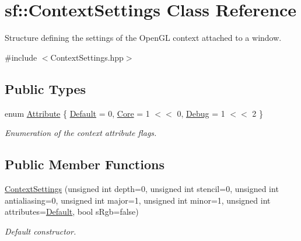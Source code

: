 \hypertarget{structsf_1_1_context_settings}{}\section{sf\+:\+:Context\+Settings Class Reference}
\label{structsf_1_1_context_settings}


Structure defining the settings of the Open\+GL context attached to a window.  




{\ttfamily \#include $<$Context\+Settings.\+hpp$>$}

\subsection*{Public Types}
\begin{DoxyCompactItemize}
\item 
enum \hyperlink{structsf_1_1_context_settings_af2e91e57e8d26c40afe2ec8efaa32a2c}{Attribute} \{ \hyperlink{structsf_1_1_context_settings_af2e91e57e8d26c40afe2ec8efaa32a2cabf868dcb751b909bf031484ed42a93bb}{Default} = 0, 
\hyperlink{structsf_1_1_context_settings_af2e91e57e8d26c40afe2ec8efaa32a2cacb581130734cbd87cbbc9438429f4a8b}{Core} = 1 $<$$<$ 0, 
\hyperlink{structsf_1_1_context_settings_af2e91e57e8d26c40afe2ec8efaa32a2ca6043f67afb3d48918d5336474eabaafc}{Debug} = 1 $<$$<$ 2
 \}\begin{DoxyCompactList}\small\item\em Enumeration of the context attribute flags. \end{DoxyCompactList}
\end{DoxyCompactItemize}
\subsection*{Public Member Functions}
\begin{DoxyCompactItemize}
\item 
\hyperlink{structsf_1_1_context_settings_ac56869ccbb6bf0df48b88880754e12b7}{Context\+Settings} (unsigned int depth=0, unsigned int stencil=0, unsigned int antialiasing=0, unsigned int major=1, unsigned int minor=1, unsigned int attributes=\hyperlink{structsf_1_1_context_settings_af2e91e57e8d26c40afe2ec8efaa32a2cabf868dcb751b909bf031484ed42a93bb}{Default}, bool s\+Rgb=false)
\begin{DoxyCompactList}\small\item\em Default constructor. \end{DoxyCompactList}\end{DoxyCompactItemize}
